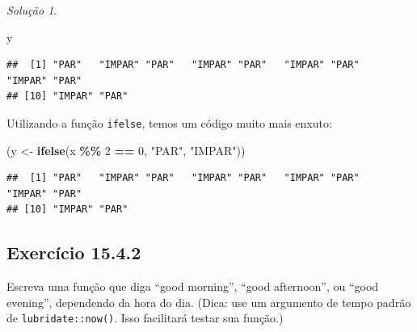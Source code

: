 \documentclass[
]{latex/krantz}
\newenvironment{Shaded}{\begin{snugshade}}{\end{snugshade}}
\newcommand{\DecValTok}[1]{\textcolor[rgb]{0.00,0.00,0.81}{#1}}
\newcommand{\FunctionTok}[1]{\textcolor[rgb]{0.13,0.29,0.53}{\textbf{#1}}}
\newcommand{\NormalTok}[1]{#1}
\newcommand{\OtherTok}[1]{\textcolor[rgb]{0.56,0.35,0.01}{#1}}
\newcommand{\SpecialCharTok}[1]{\textcolor[rgb]{0.81,0.36,0.00}{\textbf{#1}}}
\newcommand{\StringTok}[1]{\textcolor[rgb]{0.31,0.60,0.02}{#1}}
\theoremstyle{definition}
\theoremstyle{definition}
\theoremstyle{definition}
\theoremstyle{definition}
\theoremstyle{remark}
\newtheorem*{solution}{Solução}
\begin{document}
\begin{solution}
\begin{Shaded}
\begin{Highlighting}[]
\NormalTok{y}
\end{Highlighting}
\end{Shaded}

\begin{verbatim}
##  [1] "PAR"   "IMPAR" "PAR"   "IMPAR" "PAR"   "IMPAR" "PAR"   "IMPAR" "PAR"  
## [10] "IMPAR" "PAR"
\end{verbatim}

Utilizando a função \texttt{ifelse}, temos um código muito mais enxuto:

\begin{Shaded}
\begin{Highlighting}[]
\NormalTok{(y }\OtherTok{\textless{}{-}} \FunctionTok{ifelse}\NormalTok{(x }\SpecialCharTok{\%\%} \DecValTok{2} \SpecialCharTok{==} \DecValTok{0}\NormalTok{, }\StringTok{"PAR"}\NormalTok{, }\StringTok{"IMPAR"}\NormalTok{))}
\end{Highlighting}
\end{Shaded}

\begin{verbatim}
##  [1] "PAR"   "IMPAR" "PAR"   "IMPAR" "PAR"   "IMPAR" "PAR"   "IMPAR" "PAR"  
## [10] "IMPAR" "PAR"
\end{verbatim}

\end{solution}

\hypertarget{exr15-4-2}{%
\subsection*{Exercício 15.4.2}\label{exr15-4-2}}

Escreva uma função que diga ``good morning'', ``good afternoon'', ou ``good evening'', dependendo da hora do dia. (Dica: use um argumento de tempo padrão de \texttt{lubridate::now()}. Isso facilitará testar sua função.)
\end{document}
